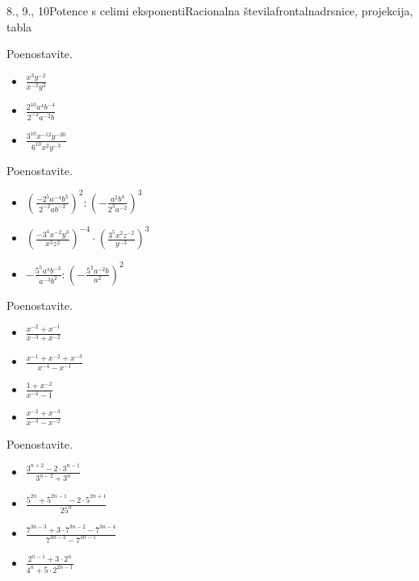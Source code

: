 \begin{priprava}{8., 9., 10}{}{Potence s celimi eksponenti}{Racionalna števila}{frontalna}{drsnice, projekcija, tabla}
            \begin{naloga}
                Poenostavite.
                \begin{itemize}
                    \item $\frac{x^3y^{-2}}{x^{-2}y^3}$ 
                    \item $\frac{2^{10}a^4b^{-4}}{2^{-2}a^{-2}b}$ 
                    \item $\frac{3^{10}x^{-12}y^{-20}}{6^{10}x^2y^{-3}}$ 
                \end{itemize}
            \end{naloga}


            \begin{naloga}
                Poenostavite.
                \begin{itemize}
                    \item $\left(\frac{-2^5a^{-4}b^3}{2^{-2}ab^{-2}}\right)^2:\left(-\frac{a^2b^4}{2^3a^{-2}}\right)^3$ 
                    \item $\left(\frac{-3^4x^{-2}y^3}{x^3z^2}\right)^{-4}\cdot\left(\frac{3^5x^2z^{-2}}{y^{-3}}\right)^3$ 
                    \item $-\frac{5^5a^4b^{-3}}{a^{-3}b^2}:\left(-\frac{5^2a^{-2}b}{a^2}\right)^2$ 
                \end{itemize}
            \end{naloga}


            \begin{naloga}
                Poenostavite.
                \begin{itemize}
                    \item $\frac{x^{-2}+x^{-1}}{x^{-3}+x^{-2}}$ 
                    \item $\frac{x^{-1}+x^{-2}+x^{-3}}{x^{-4}-x^{-1}}$ 
                    \item $\frac{1+x^{-2}}{x^{-4}-1}$ 
                    \item $\frac{x^{-2}+x^{-3}}{x^{-3}-x^{-2}}$ 
                \end{itemize}
            \end{naloga}


        
            \begin{naloga}
                Poenostavite.
                \begin{itemize}
                    \item $\frac{3^{n+2}-2\cdot 3^{n-1}}{3^{n-2}+3^n}$ 
                    \item $\frac{5^{2n}+5^{2n-1}-2\cdot 5^{2n+1}}{25^n}$ 
                    \item $\frac{7^{3n-3}+3\cdot 7^{3n-2}-7^{3n-4}}{7^{3n-2}-7^{3n-1}}$ 
                    \item $\frac{2^{n-1}+3\cdot 2^n}{4^n+5\cdot 2^{2n-1}}$ 
                \end{itemize}
            \end{naloga}



\end{priprava}
